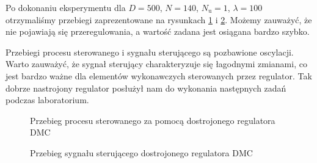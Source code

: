 Po dokonaniu eksperymentu dla $D = 500$, $N = 140$, $N_\mathrm{u} = 1$, 
$\lambda = 100$ otrzymaliśmy przebiegi zaprezentowane na rysunkach 
\ref{lab_zad4_lab_proces_wykres} i \ref{lab_zad4_lab_ster}. Możemy zauważyć, 
że nie pojawiają się przeregulowania, a wartość zadana jest osiągana bardzo szybko. 

\indent Przebiegi procesu sterowanego i sygnału sterującego są pozbawione oscylacji. 
Warto zauważyć, że sygnał sterujący charakteryzuje się łagodnymi zmianami, 
co jest bardzo ważne dla elementów wykonawczych sterowanych przez regulator. 
Tak dobrze nastrojony regulator posłużył nam do wykonania następnych 
zadań podczas laboratorium. 
\begin{figure}[t]
    
    \centering
    \caption{Przebieg procesu sterowanego za pomocą dostrojonego regulatora DMC}
    \label{lab_zad4_lab_proces_wykres}
\end{figure}

\begin{figure}[b]
    
    \centering
    \caption{Przebieg sygnału sterującego dostrojonego regulatora DMC}
    \label{lab_zad4_lab_ster}
\end{figure}
\FloatBarrier